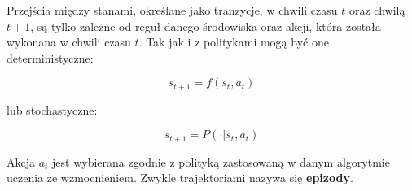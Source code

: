 Przejścia między stanami, określane jako tranzycje, w chwili czasu $t$ oraz 
chwilą $t+1$, są tylko zależne od reguł danego środowiska oraz akcji, która 
została wykonana w chwili czasu $t$. Tak jak i z politykami mogą być one 
deterministyczne:

\begin{equation}
	s_{t+1}=f(s_t, a_t)
\end{equation}

lub stochastyczne:

\begin{equation}
	s_{t+1}=P(\cdot|s_t, a_t)
\end{equation}

Akcja $a_t$ jest wybierana zgodnie z polityką zastosowaną w danym algorytmie 
uczenia ze wzmocnieniem. Zwykle trajektoriami nazywa się \textbf{epizody}.



